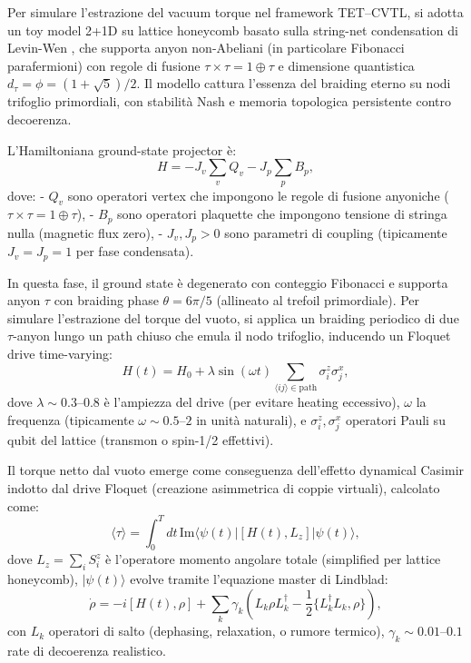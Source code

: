 \documentclass[11pt,a4paper]{article}
\let\oldcite\cite
\renewcommand{\cite}{\protect\oldcite}
\theoremstyle{plain}
\theoremstyle{definition}
\begin{document}
Per simulare l'estrazione del vacuum torque nel framework TET--CVTL, si adotta un toy model 2+1D su lattice honeycomb basato sulla string-net condensation di Levin-Wen \cite{LevinWen2005}, che supporta anyon non-Abeliani (in particolare Fibonacci parafermioni) con regole di fusione $\tau \times \tau = 1 \oplus \tau$ e dimensione quantistica $d_\tau = \phi = (1 + \sqrt{5})/2$. Il modello cattura l'essenza del braiding eterno su nodi trifoglio primordiali, con stabilità Nash e memoria topologica persistente contro decoerenza.







L'Hamiltoniana ground-state projector è:
\begin{equation}
H = - J_v \sum_v Q_v - J_p \sum_p B_p,
\end{equation}
dove:
- $Q_v$ sono operatori vertex che impongono le regole di fusione anyoniche ($\tau \times \tau = 1 \oplus \tau$),
- $B_p$ sono operatori plaquette che impongono tensione di stringa nulla (magnetic flux zero),
- $J_v, J_p > 0$ sono parametri di coupling (tipicamente $J_v = J_p = 1$ per fase condensata).

In questa fase, il ground state è degenerato con conteggio Fibonacci e supporta anyon $\tau$ con braiding phase $\theta = 6\pi/5$ (allineato al trefoil primordiale). Per simulare l'estrazione del torque del vuoto, si applica un braiding periodico di due $\tau$-anyon lungo un path chiuso che emula il nodo trifoglio, inducendo un Floquet drive time-varying:
\begin{equation}
H(t) = H_0 + \lambda \sin(\omega t) \sum_{\langle i j \rangle \in \mathrm{path}} \sigma_i^z \sigma_j^x,
\end{equation}
dove $\lambda \sim 0.3$--$0.8$ è l'ampiezza del drive (per evitare heating eccessivo), $\omega$ la frequenza (tipicamente $\omega \sim 0.5$--$2$ in unità naturali), e $\sigma_i^z, \sigma_j^x$ operatori Pauli su qubit del lattice (transmon o spin-1/2 effettivi).

Il torque netto dal vuoto emerge come conseguenza dell'effetto dynamical Casimir indotto dal drive Floquet (creazione asimmetrica di coppie virtuali), calcolato come:
\begin{equation}
\langle \tau \rangle = \int_0^T dt \, \mathrm{Im} \langle \psi(t) | [H(t), L_z] | \psi(t) \rangle,
\end{equation}
dove $L_z = \sum_i S_i^z$ è l'operatore momento angolare totale (simplified per lattice honeycomb), $|\psi(t)\rangle$ evolve tramite l'equazione master di Lindblad:
\begin{equation}
\dot{\rho} = -i [H(t), \rho] + \sum_k \gamma_k \left( L_k \rho L_k^\dagger - \frac{1}{2} \{ L_k^\dagger L_k, \rho \} \right),
\end{equation}
con $L_k$ operatori di salto (dephasing, relaxation, o rumore termico), $\gamma_k \sim 0.01$--$0.1$ rate di decoerenza realistico.
\end{document}
